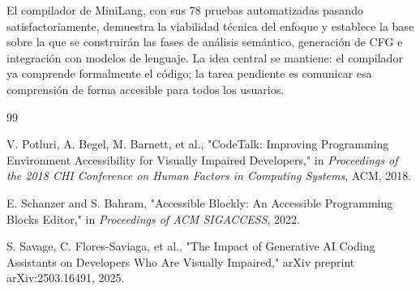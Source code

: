 \documentclass[conference]{IEEEtran}
\begin{document}
El compilador de MiniLang, con sus 78 pruebas automatizadas pasando satisfactoriamente, demuestra la viabilidad técnica del enfoque y establece la base sobre la que se construirán las fases de análisis semántico, generación de CFG e integración con modelos de lenguaje. La idea central se mantiene: el compilador ya comprende formalmente el código; la tarea pendiente es comunicar esa comprensión de forma accesible para todos los usuarios.


\begin{thebibliography}{99}

V. Potluri, A. Begel, M. Barnett, et al.,
"CodeTalk: Improving Programming Environment Accessibility for Visually Impaired Developers,"
in \textit{Proceedings of the 2018 CHI Conference on Human Factors in Computing Systems}, ACM, 2018.

E. Schanzer and S. Bahram,
"Accessible Blockly: An Accessible Programming Blocks Editor,"
in \textit{Proceedings of ACM SIGACCESS}, 2022.

S. Savage, C. Flores-Saviaga, et al.,
"The Impact of Generative AI Coding Assistants on Developers Who Are Visually Impaired,"
arXiv preprint arXiv:2503.16491, 2025.

\end{thebibliography}
\end{document}
